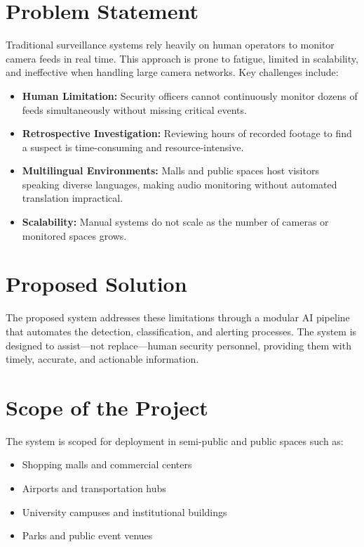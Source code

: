 \documentclass[12pt]{report}
\begin{document}
\section{Problem Statement}
Traditional surveillance systems rely heavily on human operators to monitor camera feeds in real time. This approach is prone to fatigue, limited in scalability, and ineffective when handling large camera networks. Key challenges include:

\begin{itemize}
    \item \textbf{Human Limitation:} Security officers cannot continuously monitor dozens of feeds simultaneously without missing critical events.
    \item \textbf{Retrospective Investigation:} Reviewing hours of recorded footage to find a suspect is time-consuming and resource-intensive.
    \item \textbf{Multilingual Environments:} Malls and public spaces host visitors speaking diverse languages, making audio monitoring without automated translation impractical.
    \item \textbf{Scalability:} Manual systems do not scale as the number of cameras or monitored spaces grows.
\end{itemize}

\section{Proposed Solution}
The proposed system addresses these limitations through a modular AI pipeline that automates the detection, classification, and alerting processes. The system is designed to assist---not replace---human security personnel, providing them with timely, accurate, and actionable information.

\section{Scope of the Project}
The system is scoped for deployment in semi-public and public spaces such as:
\begin{itemize}
    \item Shopping malls and commercial centers
    \item Airports and transportation hubs
    \item University campuses and institutional buildings
    \item Parks and public event venues
\end{itemize}
\end{document}
